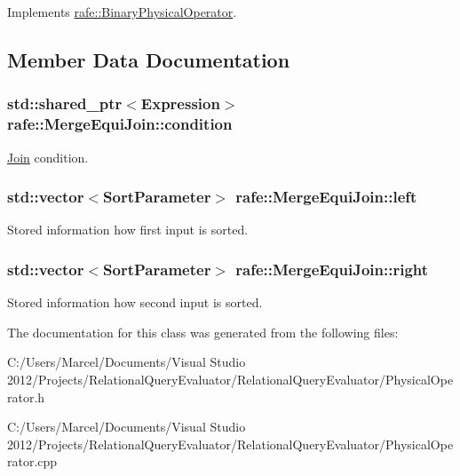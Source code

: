 Implements \hyperlink{classrafe_1_1_binary_physical_operator_a58ce0a14b970b2c932254419877a2e0e}{rafe\+::\+Binary\+Physical\+Operator}.



\subsection{Member Data Documentation}
\hypertarget{classrafe_1_1_merge_equi_join_a7b3cbe4e5b568582281f89de0eee0460}{
\subsubsection[{condition}]{\setlength{\rightskip}{0pt plus 5cm}std\+::shared\+\_\+ptr$<${\bf Expression}$>$ rafe\+::\+Merge\+Equi\+Join\+::condition}}\label{classrafe_1_1_merge_equi_join_a7b3cbe4e5b568582281f89de0eee0460}
\hyperlink{classrafe_1_1_join}{Join} condition. \hypertarget{classrafe_1_1_merge_equi_join_adff0e135df404e746d1ddfac4ac25a8d}{
\subsubsection[{left}]{\setlength{\rightskip}{0pt plus 5cm}std\+::vector$<${\bf Sort\+Parameter}$>$ rafe\+::\+Merge\+Equi\+Join\+::left}}\label{classrafe_1_1_merge_equi_join_adff0e135df404e746d1ddfac4ac25a8d}
Stored information how first input is sorted. \hypertarget{classrafe_1_1_merge_equi_join_a3d77a9923ebd3aafe2aaf87fdf81bf6e}{
\subsubsection[{right}]{\setlength{\rightskip}{0pt plus 5cm}std\+::vector$<${\bf Sort\+Parameter}$>$ rafe\+::\+Merge\+Equi\+Join\+::right}}\label{classrafe_1_1_merge_equi_join_a3d77a9923ebd3aafe2aaf87fdf81bf6e}
Stored information how second input is sorted. 

The documentation for this class was generated from the following files\+:\begin{DoxyCompactItemize}
\item 
C\+:/\+Users/\+Marcel/\+Documents/\+Visual Studio 2012/\+Projects/\+Relational\+Query\+Evaluator/\+Relational\+Query\+Evaluator/Physical\+Operator.\+h\item 
C\+:/\+Users/\+Marcel/\+Documents/\+Visual Studio 2012/\+Projects/\+Relational\+Query\+Evaluator/\+Relational\+Query\+Evaluator/Physical\+Operator.\+cpp\end{DoxyCompactItemize}
